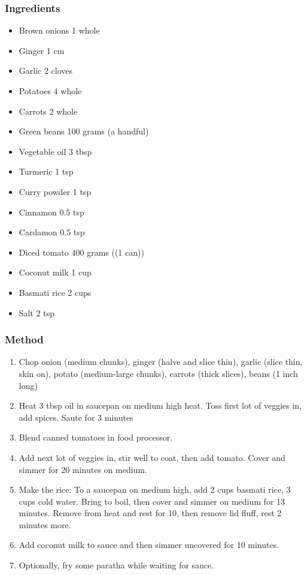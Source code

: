 \documentclass[]{article}
\begin{document}
\subsubsection*{\Large Ingredients}
\begin{multicols}{2}
\begin{itemize}
 \item Brown onions \hfill 1 whole
 \item Ginger \hfill 1 cm
 \item Garlic \hfill 2 cloves
 \item Potatoes \hfill 4 whole
 \item Carrots \hfill 2 whole
 \item Green beans \hfill 100 grams (a handful)
 \item Vegetable oil \hfill 3 tbsp
 \item Turmeric \hfill 1 tsp
 \item Curry powder \hfill 1 tsp
 \item Cinnamon \hfill 0.5 tsp
 \item Cardamon \hfill 0.5 tsp
 \item Diced tomato \hfill 400 grams ((1 can))
 \item Coconut milk \hfill 1 cup
 \item Basmati rice \hfill 2 cups
 \item Salt \hfill 2 tsp
\end{itemize}
\end{multicols}
\subsubsection*{\Large Method}
\begin{enumerate}[font=\huge\color{accent}]
	\item Chop onion (medium chunks), ginger (halve and slice thin), garlic (slice thin, skin on), potato (medium-large chunks), carrots (thick slices), beans (1 inch long)
	\item Heat 3 tbsp oil in saucepan on medium high heat. Toss first lot of veggies in, add spices. Saute for 3 minutes
	\item Blend canned tomatoes in food processor.
	\item Add next lot of veggies in, stir well to coat, then add tomato. Cover and simmer for 20 minutes on medium.
	\item Make the rice: To a saucepan on medium high, add 2 cups basmati rice, 3 cups cold water. Bring to boil, then cover and simmer on medium for 13 minutes. Remove from heat and rest for 10, then remove lid fluff, rest 2 minutes more.
	\item Add coconut milk to sauce and then simmer uncovered for 10 minutes.
	\item Optionally, fry some paratha while waiting for sauce.
\end{enumerate}
\newpage
{}
\end{document}
